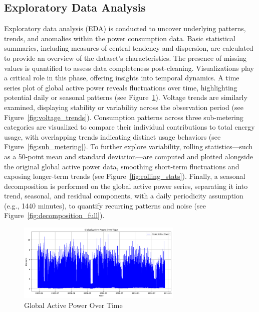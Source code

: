 	\subsection{Exploratory Data Analysis}
	Exploratory data analysis (EDA) is conducted to uncover underlying patterns, trends, and anomalies within the power consumption data. Basic statistical summaries, including measures of central tendency and dispersion, are calculated to provide an overview of the dataset's characteristics. The presence of missing values is quantified to assess data completeness post-cleaning. Visualizations play a critical role in this phase, offering insights into temporal dynamics. A time series plot of global active power reveals fluctuations over time, highlighting potential daily or seasonal patterns (see Figure~\ref{fig:global_active_power}). Voltage trends are similarly examined, displaying stability or variability across the observation period (see Figure~\ref{fig:voltage_trends}). Consumption patterns across three sub-metering categories are visualized to compare their individual contributions to total energy usage, with overlapping trends indicating distinct usage behaviors (see Figure~\ref{fig:sub_metering}). To further explore variability, rolling statistics—such as a 50-point mean and standard deviation—are computed and plotted alongside the original global active power data, smoothing short-term fluctuations and exposing longer-term trends (see Figure~\ref{fig:rolling_stats}). Finally, a seasonal decomposition is performed on the global active power series, separating it into trend, seasonal, and residual components, with a daily periodicity assumption (e.g., 1440 minutes), to quantify recurring patterns and noise (see Figure~\ref{fig:decomposition_full}).
	
	\begin{figure}[htbp]
		\centering
		\includegraphics[width=0.7\textwidth]{./figures_aman/global_active_power_over_time.png}
		\caption{Global Active Power Over Time}
		\label{fig:global_active_power}
	\end{figure}
	
